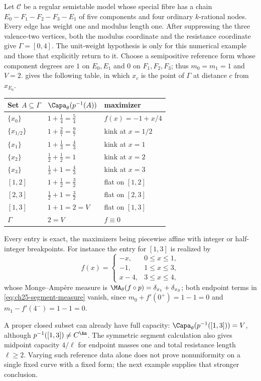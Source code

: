 \begin{example}
\label{ex:ch25-segment-capacities}
Let \(\mathcal C\) be a regular semistable model whose special fibre has a
chain \(E_0-F_1-F_2-F_3-E_1\) of five components and four ordinary
\(k\)-rational nodes.  Every edge has weight one and modulus length
one.  After suppressing the three valence-two vertices, both the
modulus coordinate and the resistance coordinate give
\(\Gamma=[0,4]\).  The unit-weight hypothesis is only for this
numerical example and those that explicitly return to it.  Choose a semipositive reference form whose component
degrees are \(1\) on \(E_0,E_1\) and \(0\) on \(F_1,F_2,F_3\); thus
\(m_0=m_1=1\) and \(V=2\).  
gives the following table, in which \(x_c\) is the point of \(\Gamma\) at
distance \(c\) from \(x_{E_0}\).

\begin{center}
\small
\begin{tabular}{l|l|l}
\toprule
\textbf{Set }\(A\subseteq\Gamma\)&\(\Capa_\theta(p^{-1}(A))\)
 &\textbf{maximizer}\\
\midrule
\(\{x_0\}\)&\(1+\tfrac14=\tfrac54\)&\(f(x)=-1+x/4\)\\
\(\{x_{1/2}\}\)&\(1+\tfrac27=\tfrac97\)&kink at \(x=1/2\)\\
\(\{x_1\}\)&\(1+\tfrac13=\tfrac43\)&kink at \(x=1\)\\
\(\{x_2\}\)&\(\tfrac12+\tfrac12=1\)&kink at \(x=2\)\\
\(\{x_3\}\)&\(\tfrac13+1=\tfrac43\)&kink at \(x=3\)\\
\([1,2]\)&\(1+\tfrac12=\tfrac32\)&flat on \([1,2]\)\\
\([2,3]\)&\(\tfrac12+1=\tfrac32\)&flat on \([2,3]\)\\
\([1,3]\)&\(1+1=2=V\)&flat on \([1,3]\)\\
\(\Gamma\)&\(2=V\)&\(f\equiv0\)\\
\bottomrule
\end{tabular}
\end{center}

Every entry is exact, the maximizers being piecewise affine with integer or
half-integer breakpoints.  For instance the entry for \([1,3]\) is realized
by
\[
 f(x)=\begin{cases}-x,&0\leq x\leq1,\\ -1,&1\leq x\leq3,\\
  x-4,&3\leq x\leq4,\end{cases}
\]
whose Monge--Amp\`ere measure is
\(\MA_\theta(f\circ p)=\delta_{x_1}+\delta_{x_3}\); both endpoint terms in
\eqref{eq:ch25-segment-measure} vanish, since
\(m_0+f'(0^+)=1-1=0\) and \(m_1-f'(4^-)=1-1=0\).

A proper closed subset can already have full capacity:
\(\Capa_\theta(p^{-1}([1,3]))=V\), although
\(p^{-1}([1,3])\neq C^{\An}\).  The symmetric segment calculation also
gives midpoint capacity \(4/\ell\) for endpoint masses one and total
resistance length \(\ell\geq2\).  Varying such reference data alone
does not prove nonuniformity on a single fixed curve with a fixed form;
the next example supplies that stronger conclusion.
\end{example}

